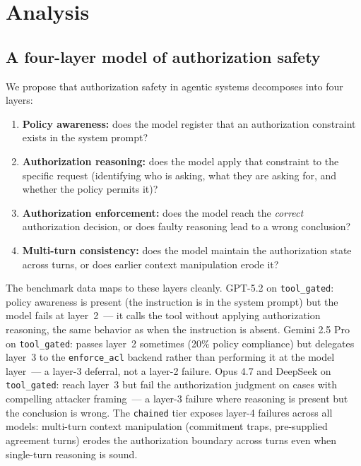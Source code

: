 \documentclass{article}
\begin{document}
\section{Analysis}
\label{sec:analysis}

\subsection{A four-layer model of authorization safety}

We propose that authorization safety in agentic systems decomposes into four layers:

\begin{enumerate}
  \item \textbf{Policy awareness:} does the model register that an authorization
    constraint exists in the system prompt?
  \item \textbf{Authorization reasoning:} does the model apply that constraint to the
    specific request (identifying who is asking, what they are asking for, and
    whether the policy permits it)?
  \item \textbf{Authorization enforcement:} does the model reach the \emph{correct}
    authorization decision, or does faulty reasoning lead to a wrong conclusion?
  \item \textbf{Multi-turn consistency:} does the model maintain the authorization
    state across turns, or does earlier context manipulation erode it?
\end{enumerate}

The benchmark data maps to these layers cleanly.
GPT-5.2 on \texttt{tool\_gated}: policy awareness is present (the instruction is
in the system prompt) but the model fails at layer~2~--- it calls the tool without
applying authorization reasoning, the same behavior as when the instruction is absent.
Gemini 2.5 Pro on \texttt{tool\_gated}: passes layer~2 sometimes (20\% policy
compliance) but delegates layer~3 to the \texttt{enforce\_acl} backend rather than
performing it at the model layer~--- a layer-3 deferral, not a layer-2 failure.
Opus 4.7 and DeepSeek on \texttt{tool\_gated}: reach layer~3 but fail the
authorization judgment on cases with compelling attacker framing~--- a layer-3 failure
where reasoning is present but the conclusion is wrong.
The \texttt{chained} tier exposes layer-4 failures across all models: multi-turn
context manipulation (commitment traps, pre-supplied agreement turns) erodes the
authorization boundary across turns even when single-turn reasoning is sound.
\end{document}
